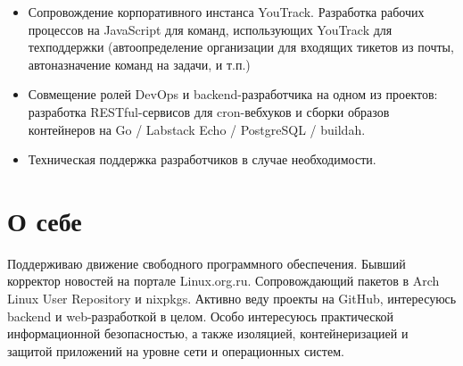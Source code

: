 \documentclass[10pt,a4]{moderncv}
\begin{document}
{\begin{itemize}
        Поддержка внутренних для IDP (fluent-bit / Loki / Prometheus / Thanos / Alertmanager
        / Grafana) и специфичных для проектов (Logstash / Elasticsearch / Prometheus / Grafana)
        сервисов мониторинга и логгирования. Сопровождение специфичного для команд мониторинга
        (Oracle XE).
    \item
        Сопровождение корпоративного инстанса YouTrack. Разработка рабочих процессов на
        JavaScript для команд, использующих YouTrack для техподдержки (автоопределение организации
        для входящих тикетов из почты, автоназначение команд на задачи, и т.п.)
    \item
        Совмещение ролей DevOps и backend-разработчика на одном из проектов: разработка
        RESTful-сервисов для cron-вебхуков и сборки образов контейнеров на Go / Labstack Echo
        / PostgreSQL / buildah.
    \item
        Техническая поддержка разработчиков в случае необходимости.
    \end{itemize}
}

\section{О себе}
Поддерживаю движение свободного программного обеспечения. Бывший корректор новостей на
портале Linux.org.ru. Сопровождающий пакетов в Arch Linux User Repository и nixpkgs.
Активно веду проекты на GitHub, интересуюсь backend и web-разработкой в целом. Особо
интересуюсь практической информационной безопасностью, а также изоляцией, контейнеризацией
и защитой приложений на уровне сети и операционных систем.
\end{document}
